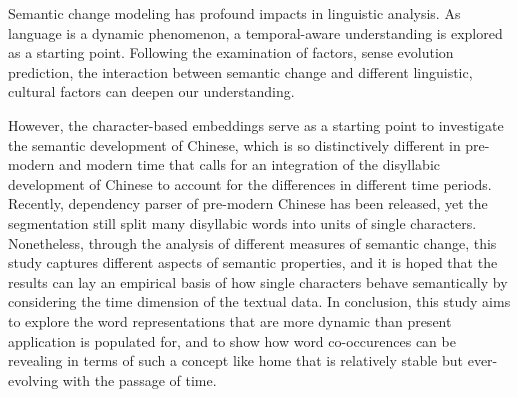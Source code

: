 Semantic change modeling has profound impacts in linguistic analysis. As language is a dynamic phenomenon, a temporal-aware understanding is explored as a starting point. Following the examination of factors, sense evolution prediction, the interaction between semantic change and different linguistic, cultural factors can deepen our understanding.

However, the character-based embeddings serve as a starting point to investigate the semantic development of Chinese, which is so distinctively different in pre-modern and modern time that calls for an integration of the disyllabic development of Chinese to account for the differences in different time periods. Recently, dependency parser of pre-modern Chinese has been released, yet the segmentation still split many disyllabic words into units of single characters. Nonetheless, through the analysis of different measures of semantic change, this study captures different aspects of semantic properties, and it is hoped that the results can lay an empirical basis of how single characters behave semantically by considering the time dimension of the textual data. In conclusion, this study aims to explore the word representations that are more dynamic than present application is populated for, and to show how word co-occurences can be revealing in terms of such a concept like home that is relatively stable but ever-evolving with the passage of time.
